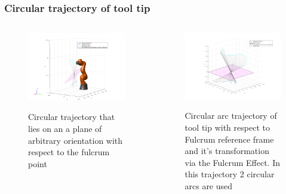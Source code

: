 \begin{frame}
\frametitle{Circular trajectory of tool tip}

\begin{columns}
\begin{center}
\begin{figure}[!htb]
\centering
\includegraphics[width=\textwidth]{../images/rcm_trajectories/robot-pose-random-rcm-circle-traj.png}\\
\caption{Circular trajectory that lies on an a plane of arbitrary orientation with respect to the fulcrum point}
\end{figure}
\end{center}

\begin{center}
\begin{figure}[!htb]
\centering
\includegraphics[width=\textwidth]{../images/rcm_trajectories/rcm_arcs_traj.png}\\
\caption{Circular arc trajectory of tool tip with respect to Fulcrum reference frame and it's transformation via the Fulcrum Effect. In this trajectory 2 circular arcs are used}
\end{figure}
\end{center}

\end{columns}
\end{frame}


